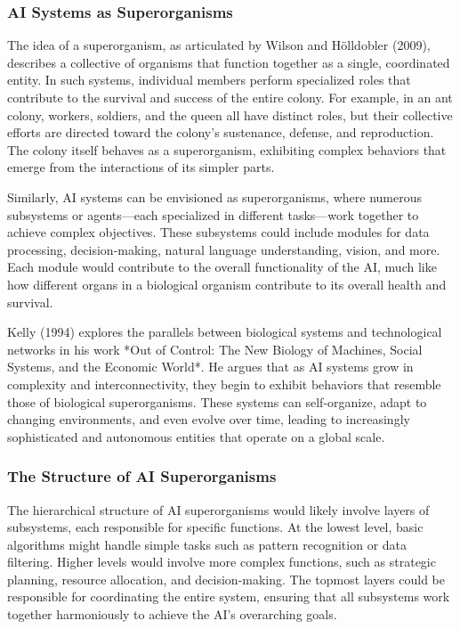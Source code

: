 \documentclass[12pt,twoside]{article}
\begin{document}
\subsubsection{AI Systems as Superorganisms}

The idea of a superorganism, as articulated by Wilson and Hölldobler (2009), describes a collective of organisms that function together as a single, coordinated entity. In such systems, individual members perform specialized roles that contribute to the survival and success of the entire colony. For example, in an ant colony, workers, soldiers, and the queen all have distinct roles, but their collective efforts are directed toward the colony's sustenance, defense, and reproduction. The colony itself behaves as a superorganism, exhibiting complex behaviors that emerge from the interactions of its simpler parts.

Similarly, AI systems can be envisioned as superorganisms, where numerous subsystems or agents—each specialized in different tasks—work together to achieve complex objectives. These subsystems could include modules for data processing, decision-making, natural language understanding, vision, and more. Each module would contribute to the overall functionality of the AI, much like how different organs in a biological organism contribute to its overall health and survival.

Kelly (1994) explores the parallels between biological systems and technological networks in his work *Out of Control: The New Biology of Machines, Social Systems, and the Economic World*. He argues that as AI systems grow in complexity and interconnectivity, they begin to exhibit behaviors that resemble those of biological superorganisms. These systems can self-organize, adapt to changing environments, and even evolve over time, leading to increasingly sophisticated and autonomous entities that operate on a global scale.

\subsubsection{The Structure of AI Superorganisms}

The hierarchical structure of AI superorganisms would likely involve layers of subsystems, each responsible for specific functions. At the lowest level, basic algorithms might handle simple tasks such as pattern recognition or data filtering. Higher levels would involve more complex functions, such as strategic planning, resource allocation, and decision-making. The topmost layers could be responsible for coordinating the entire system, ensuring that all subsystems work together harmoniously to achieve the AI's overarching goals.
\end{document}
